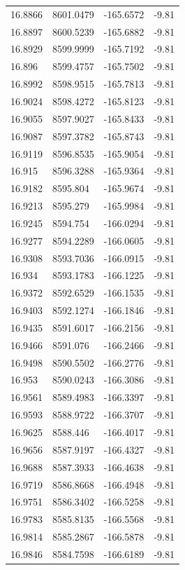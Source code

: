 \begin{table}[H]
\begin{tabular}{llll}
16.8866 & 8601.0479 & -165.6572 & -9.81 \\
16.8897 & 8600.5239 & -165.6882 & -9.81 \\
16.8929 & 8599.9999 & -165.7192 & -9.81 \\
16.896 & 8599.4757 & -165.7502 & -9.81 \\
16.8992 & 8598.9515 & -165.7813 & -9.81 \\
16.9024 & 8598.4272 & -165.8123 & -9.81 \\
16.9055 & 8597.9027 & -165.8433 & -9.81 \\
16.9087 & 8597.3782 & -165.8743 & -9.81 \\
16.9119 & 8596.8535 & -165.9054 & -9.81 \\
16.915 & 8596.3288 & -165.9364 & -9.81 \\
16.9182 & 8595.804 & -165.9674 & -9.81 \\
16.9213 & 8595.279 & -165.9984 & -9.81 \\
16.9245 & 8594.754 & -166.0294 & -9.81 \\
16.9277 & 8594.2289 & -166.0605 & -9.81 \\
16.9308 & 8593.7036 & -166.0915 & -9.81 \\
16.934 & 8593.1783 & -166.1225 & -9.81 \\
16.9372 & 8592.6529 & -166.1535 & -9.81 \\
16.9403 & 8592.1274 & -166.1846 & -9.81 \\
16.9435 & 8591.6017 & -166.2156 & -9.81 \\
16.9466 & 8591.076 & -166.2466 & -9.81 \\
16.9498 & 8590.5502 & -166.2776 & -9.81 \\
16.953 & 8590.0243 & -166.3086 & -9.81 \\
16.9561 & 8589.4983 & -166.3397 & -9.81 \\
16.9593 & 8588.9722 & -166.3707 & -9.81 \\
16.9625 & 8588.446 & -166.4017 & -9.81 \\
16.9656 & 8587.9197 & -166.4327 & -9.81 \\
16.9688 & 8587.3933 & -166.4638 & -9.81 \\
16.9719 & 8586.8668 & -166.4948 & -9.81 \\
16.9751 & 8586.3402 & -166.5258 & -9.81 \\
16.9783 & 8585.8135 & -166.5568 & -9.81 \\
16.9814 & 8585.2867 & -166.5878 & -9.81 \\
16.9846 & 8584.7598 & -166.6189 & -9.81 \\

\end{tabular}
\end{table}
